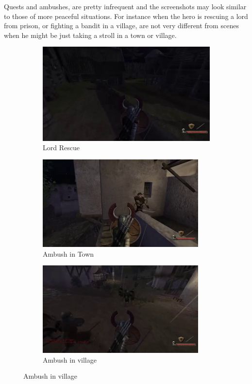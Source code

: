 \documentclass[
]{article}
\begin{document}
Quests and ambushes, are pretty infrequent and the screenshots may look
similar to those of more peaceful situations. For instance when the hero is rescuing a lord from prison, or fighting a bandit in a village, are not very different from scenes when he might be just taking a stroll in a town or village.


\begin{figure}
	\centering
	\begin{subfigure}[b]{0.3\textwidth}
		\includegraphics[width=\linewidth]{docimages/E_0054_00_40_24.jpg}
		\caption{Lord Rescue}
	\end{subfigure}
	\begin{subfigure}[b]{0.3\textwidth}
		\includegraphics[width=\linewidth]{docimages/E_0063_00_27_08.jpg}
		\caption{Ambush in Town}
	\end{subfigure}
	\begin{subfigure}[b]{0.3\textwidth}
		\includegraphics[width=\linewidth]{docimages/E_0067_00_52_32.jpg}
		\caption{Ambush in village}
	\end{subfigure}
\end{figure}
\end{document}
